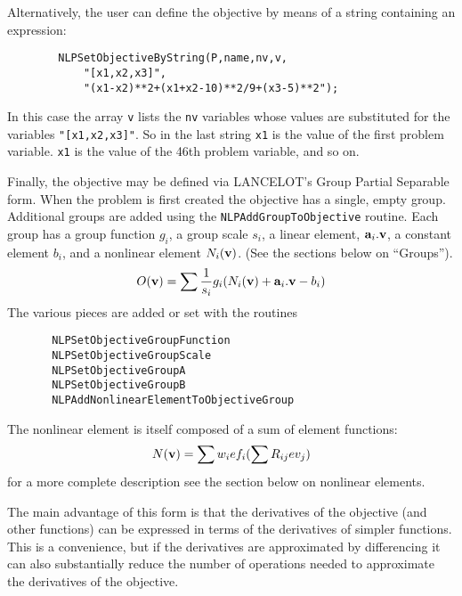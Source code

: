 \documentclass[12pt]{article}
\begin{document}
     Alternatively, the user can define the objective by means of a string containing an expression:
     \begin{verbatim}
        NLPSetObjectiveByString(P,name,nv,v,
            "[x1,x2,x3]",
            "(x1-x2)**2+(x1+x2-10)**2/9+(x3-5)**2");
     \end{verbatim}
     In this case the array {\tt v} lists the {\tt nv} variables whose values are substituted for the variables 
     {\tt "[x1,x2,x3]"}. So in the last string {\tt x1} is the value of the first problem variable. {\tt x1} is the
     value of the 46th problem variable, and so on.

     Finally, the objective may be defined via LANCELOT's Group Partial Separable form. When the problem is 
     first created the objective has a single, empty group. Additional groups are added using the
     {\tt NLPAdd\-Group\-To\-Objective} routine. Each group has a group function $g_i$, a group scale $s_i$,
     a linear element, ${\bf a}_i.{\bf v}$, a constant element $b_i$, and a nonlinear element $N_i({\bf v})$.
     (See the sections below on ``Groups''). 
     \begin{displaymath}
       O({\bf v}) = \sum {1\over{s_i}}g_i(N_i({\bf v})+ {\bf a}_i.{\bf v}-b_i)
     \end{displaymath}
     The various pieces are added or set with the routines
     \begin{verbatim}
       NLPSetObjectiveGroupFunction
       NLPSetObjectiveGroupScale
       NLPSetObjectiveGroupA
       NLPSetObjectiveGroupB
       NLPAddNonlinearElementToObjectiveGroup
     \end{verbatim}
     The nonlinear element is itself composed of a sum of element functions:
     \begin{displaymath}
       N({\bf v}) = \sum w_i ef_i( \sum R_{ij} ev_j )
     \end{displaymath}
     for a more complete description see the section below on nonlinear elements.

     The main advantage of this form is that the derivatives of the objective (and other functions) can be
     expressed in terms of the derivatives of simpler functions. This is a convenience, but if the derivatives
     are approximated by differencing it can also substantially reduce the number of operations needed to approximate
     the derivatives of the objective.
\end{document}
